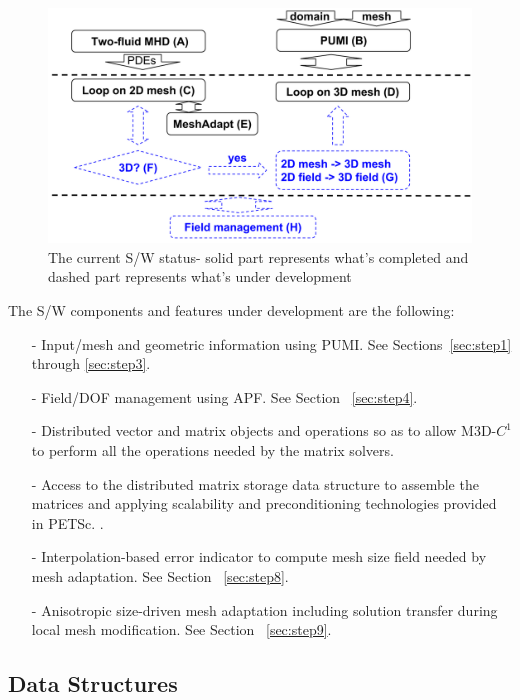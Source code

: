 \documentclass[11pt]{article}  %
\begin{document}
\begin{figure}[hbt]
\center
\includegraphics[width=5in]{fig/M3DC1LoopNewSim.png}
\caption{\small{The current S/W status- solid part represents what's completed and dashed part represents what's under development}} 
\label{fig:M3DC1LoopNew}
\end{figure}

The S/W components and features under development are the following:
\begin{itemize}
\item[-] Input/mesh and geometric information using PUMI. See Sections~\ref{sec:step1} through \ref{sec:step3}.
\item[-] Field/DOF management using APF. See Section ~\ref{sec:step4}.
\item[-] Distributed vector and matrix objects and operations so as to allow M3D-$C^1$ to perform all the operations needed by the matrix solvers. 
\item[-] Access to the distributed matrix storage data structure to assemble the matrices and applying scalability and preconditioning technologies provided in PETSc. .
\item[-] Interpolation-based error indicator to compute mesh size field needed by mesh adaptation. See Section ~\ref{sec:step8}.
\item[-] Anisotropic size-driven mesh adaptation including solution transfer during local mesh modification. See Section ~\ref{sec:step9}.
\end{itemize}

\subsection{Data Structures}
\end{document}

